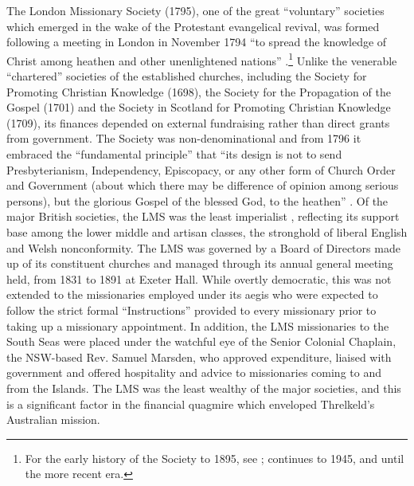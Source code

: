 \enlargethispage{\baselineskip}

The London Missionary Society (1795), one of the great “voluntary” societies which emerged in the wake of the Protestant evangelical revival, was formed following a meeting in London in November 1794 “to spread the knowledge of Christ among heathen and other unenlightened nations” \citep[10]{soas_guide_2017}.\footnote{For the early history of the Society to 1895, see \citet{lovett_history_1899}; \citet{goodall_history_1954} continues to 1945, and \citet{thorogood_gales_1994} until the more recent era.} Unlike the venerable “chartered” societies of the established churches, including the Society for Promoting Christian Knowledge (1698), the Society for the Propagation of the Gospel (1701) and the Society in Scotland for Promoting Christian Knowledge (1709), its finances depended on external fundraising rather than direct grants from government. The Society was non-denominational and from 1796 it embraced the “fundamental principle” that “its design is not to send Presbyterianism, Independency, Episcopacy, or any other form of Church Order and Government (about which there may be difference of opinion among serious persons), but the glorious Gospel of the blessed God, to the heathen” \citep[2]{goodall_history_1954}. Of the major British societies, the LMS was the least imperialist \citep[5]{darch_missionary_2009}, reflecting its support base among the lower middle and artisan classes, the stronghold of liberal English and Welsh nonconformity. The LMS was governed by a Board of Directors made up of its constituent churches and managed through its annual general meeting held, from 1831 to 1891 at Exeter Hall. While overtly democratic, this was not extended to the missionaries employed under its aegis who were expected to follow the strict formal “Instructions” provided to every missionary prior to taking up a missionary appointment. In addition, the LMS missionaries to the South Seas were placed under the watchful eye of the Senior Colonial Chaplain, the NSW-based Rev. Samuel Marsden, who approved expenditure, liaised with government and offered hospitality and advice to missionaries coming to and from the Islands. The LMS was the least wealthy of the major societies, and this is a significant factor in the financial quagmire which enveloped Threlkeld’s Australian mission.

